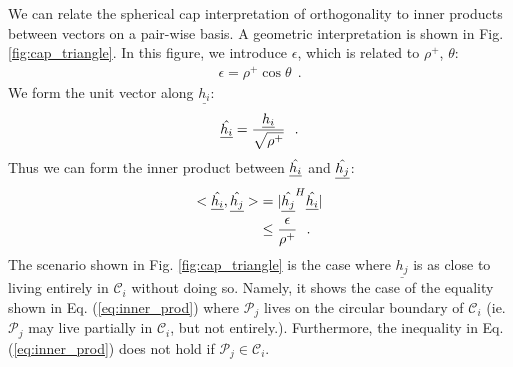 We can relate the spherical cap interpretation of orthogonality to inner products between vectors on a pair-wise basis. A geometric interpretation is shown in Fig. \ref{fig:cap_triangle}. In this figure, we introduce $\epsilon$, which is related to $\rho^+$, $\theta$:
\begin{equation}\label{eq:epsilon}
    \begin{aligned}
    \epsilon = \rho^+\cos{\theta} \ \ .
    \end{aligned}
\end{equation}
We form the unit vector along $\underline{h_i}$:
\begin{equation}\label{eq:unit_vec}
    \begin{aligned}
    \Hat{\underline{h_i}} = \frac{\underline{h_i}}{\sqrt{\rho^+}} \ \ .
    \end{aligned}
\end{equation}
Thus we can form the inner product between $\Hat{\underline{h_i}}$ and $\Hat{\underline{h_j}}$:
\begin{equation}\label{eq:inner_prod}
    \begin{aligned}
    <\Hat{\underline{h_i}},\Hat{\underline{h_j}}> &= \vert \Hat{\underline{h_j}}^H\Hat{\underline{h_i}} \vert\\
    &\leq \frac{\epsilon}{\rho^+} \ \ .
    \end{aligned}
\end{equation}
The scenario shown in Fig. \ref{fig:cap_triangle} is the case where $\underline{h_j}$ is as close to living entirely in $\mathcal{C}_i$ without doing so. Namely, it shows the case of the equality shown in Eq. (\ref{eq:inner_prod}) where $\mathcal{P}_j$ lives on the circular boundary of $\mathcal{C}_i$ (ie. $\mathcal{P}_j$ may live partially in $\mathcal{C}_i$, but not entirely.). Furthermore, the inequality in Eq. (\ref{eq:inner_prod}) does not hold if $\mathcal{P}_j\in \mathcal{C}_i$.
